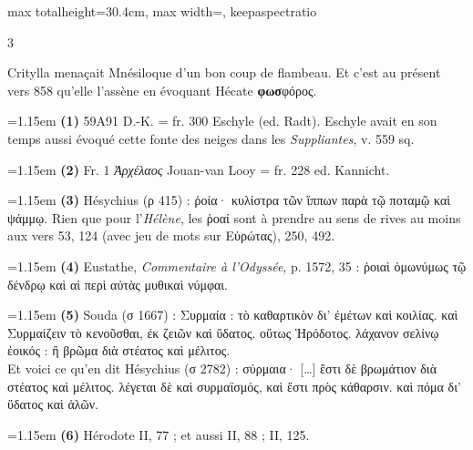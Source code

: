\documentclass[11pt,twoside]{book}
\newcommand{\italique}[1]{\textit{#1}}
\begin{document}
\begin{adjustbox}{max totalheight=30.4cm, max width=\textwidth, keepaspectratio}
\begin{minipage}{\textwidth}
{\begin{multicols}{3}
\par\vspace{1.5pt}
\noindent Critylla menaçait Mnésiloque d'un bon coup de flambeau. Et c'est au présent vers 858 qu'elle l'assène en évoquant Hécate \textbf{φωσ}φόρος.
\par\vspace{1.5pt}
\par\vspace{1.2pt}\par\nopagebreak\vspace{1pt}\noindent\hangindent=1.15em {\color{sepiaNote}\textbf{(1)}} 59A91 D.-K. = fr. 300 Eschyle (ed. Radt). Eschyle avait en son temps aussi évoqué cette fonte des neiges dans les \italique{Suppliantes}, v. 559 sq.
\par\vspace{1.5pt}
\noindent\hangindent=1.15em {\color{sepiaNote}\textbf{(2)}} Fr. 1 \italique{Ἀρχέλαος} Jouan-van Looy = fr. 228 ed. Kannicht.
\par\vspace{1.5pt}
\noindent\hangindent=1.15em {\color{sepiaNote}\textbf{(3)}} Hésychius (ρ 415) : ῥοία· κυλίστρα τῶν ἵππων παρὰ τῷ ποταμῷ καὶ ψάμμῳ. Rien que pour l'\italique{Hélène}, les ῥοαί sont à prendre au sens de rives au moins aux vers 53, 124 (avec jeu de mots sur Εὐρώτας), 250, 492.
\par\vspace{1.5pt}
\noindent\hangindent=1.15em {\color{sepiaNote}\textbf{(4)}} Eustathe, \italique{Commentaire à l'Odyssée}, p. 1572, 35 : ῥοιαὶ ὁμωνύμως τῷ δένδρῳ καὶ αἱ περὶ αὐτὰς μυθικαὶ νύμφαι.
\par\vspace{1.5pt}
\noindent\hangindent=1.15em {\color{sepiaNote}\textbf{(5)}} Souda (σ 1667) : Συρμαία : τὸ καθαρτικὸν δι' ἐμέτων καὶ κοιλίας. καὶ Συρμαίζειν τὸ κενοῦσθαι, ἐκ ζειῶν καὶ ὕδατος. οὕτως Ἡρόδοτος. λάχανον σελίνῳ ἐοικός : ἢ βρῶμα διὰ στέατος καὶ μέλιτος.\\ Et voici ce qu'en dit Hésychius (σ 2782) : σύρμαια· […] ἔστι δὲ βρωμάτιον διὰ στέατος καὶ μέλιτος. λέγεται δὲ καὶ συρμαϊσμός, καὶ ἔστι πρὸς κάθαρσιν. καὶ πόμα δι' ὕδατος καὶ ἁλῶν.
\par\vspace{1.5pt}
\noindent\hangindent=1.15em {\color{sepiaNote}\textbf{(6)}} Hérodote II, 77 ; et aussi II, 88 ; II, 125.
\par\vspace{1.5pt}

\end{multicols}}
\end{minipage}
\end{adjustbox}
\end{document}
